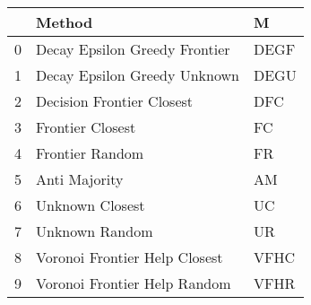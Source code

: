 \begin{tabular}{lll}
\toprule
{} &                         Method &     M \\
\midrule
0 &  Decay Epsilon Greedy Frontier &  DEGF \\
1 &   Decay Epsilon Greedy Unknown &  DEGU \\
2 &      Decision Frontier Closest &   DFC \\
3 &               Frontier Closest &    FC \\
4 &                Frontier Random &    FR \\
5 &                  Anti Majority &    AM \\
6 &                Unknown Closest &    UC \\
7 &                 Unknown Random &    UR \\
8 &  Voronoi Frontier Help Closest &  VFHC \\
9 &   Voronoi Frontier Help Random &  VFHR \\
\bottomrule
\end{tabular}

